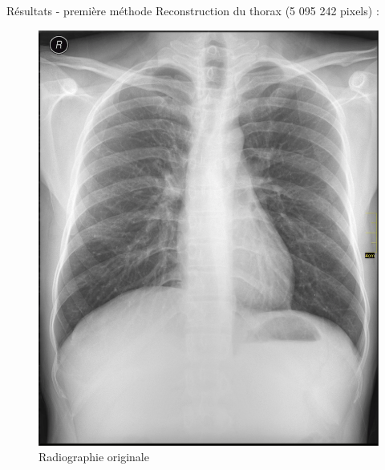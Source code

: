 \documentclass{beamer}
\begin{document}
\begin{frame}{Résultats - première méthode}
    Reconstruction du thorax (5 095 242 pixels) : 
    \begin{figure}
        \centering 
        \includegraphics[scale = 0.065]{radio_thora.jpeg}
        \caption{Radiographie originale}
    \end{figure}
\end{frame}
\end{document}
